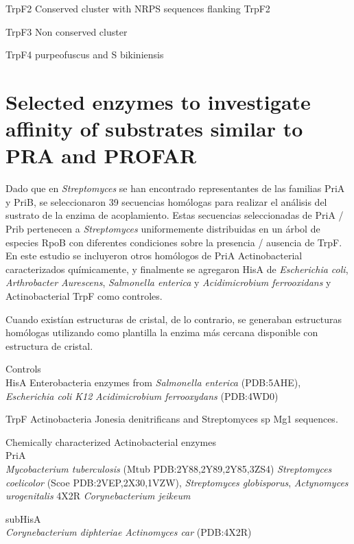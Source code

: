 \documentclass[12pt,twoside]{reedthesis}
\begin{document}
  TrpF2 Conserved cluster with NRPS sequences flanking TrpF2
  
  TrpF3 Non conserved cluster
  
  TrpF4 purpeofuscus and S bikiniensis \clearpage  
  
  \section{Selected enzymes to investigate affinity of substrates similar
  to PRA and
  PROFAR}\label{selected-enzymes-to-investigate-affinity-of-substrates-similar-to-pra-and-profar}
  
  Dado que en \emph{Streptomyces} se han encontrado representantes de las
  familias PriA y PriB, se seleccionaron 39 secuencias homólogas para
  realizar el análisis del sustrato de la enzima de acoplamiento. Estas
  secuencias seleccionadas de PriA / Prib pertenecen a \emph{Streptomyces}
  uniformemente distribuidas en un árbol de especies RpoB con diferentes
  condiciones sobre la presencia / ausencia de TrpF. En este estudio se
  incluyeron otros homólogos de PriA Actinobacterial caracterizados
  químicamente, y finalmente se agregaron HisA de \emph{Escherichia coli},
  \emph{Arthrobacter Aurescens}, \emph{Salmonella enterica} y
  \emph{Acidimicrobium ferrooxidans} y Actinobacterial TrpF como
  controles.
  
  Cuando existían estructuras de cristal, de lo contrario, se generaban
  estructuras homólogas utilizando como plantilla la enzima más cercana
  disponible con estructura de cristal.
  
  Controls\\
  HisA Enterobacteria enzymes from \emph{Salmonella enterica} (PDB:5AHE),
  \emph{Escherichia coli K12} \emph{Acidimicrobium ferrooxydans}
  (PDB:4WD0)
  
  TrpF Actinobacteria Jonesia denitrificans and Streptomyces sp Mg1
  sequences.
  
  Chemically characterized Actinobacterial enzymes\\
  PriA\\
  \emph{Mycobacterium tuberculosis} (Mtub PDB:2Y88,2Y89,2Y85,3ZS4)
  \emph{Streptomyces coelicolor} (Scoe PDB:2VEP,2X30,1VZW),
  \emph{Streptomyces globisporus}, \emph{Actynomyces urogenitalis} 4X2R
  \emph{Corynebacterium jeikeum}
  
  subHisA\\
  \emph{Corynebacterium diphteriae} \emph{Actinomyces car} (PDB:4X2R)
  
\end{document}
